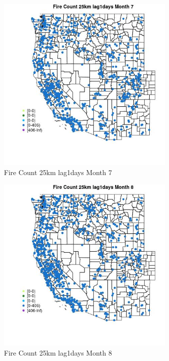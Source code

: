 \begin{figure} 
\centering  
\includegraphics[width=0.77\textwidth]{Code_Outputs/Report_ML_input_PM25_Step4_part_f_de_duplicated_aves_prioritize_24hr_obswNAs_MapObsMo7Fire_Count_25km_lag1days.jpg} 
\caption{\label{fig:Report_ML_input_PM25_Step4_part_f_de_duplicated_aves_prioritize_24hr_obswNAsMapObsMo7Fire_Count_25km_lag1days}Fire Count 25km lag1days Month 7} 
\end{figure} 
 

\begin{figure} 
\centering  
\includegraphics[width=0.77\textwidth]{Code_Outputs/Report_ML_input_PM25_Step4_part_f_de_duplicated_aves_prioritize_24hr_obswNAs_MapObsMo8Fire_Count_25km_lag1days.jpg} 
\caption{\label{fig:Report_ML_input_PM25_Step4_part_f_de_duplicated_aves_prioritize_24hr_obswNAsMapObsMo8Fire_Count_25km_lag1days}Fire Count 25km lag1days Month 8} 
\end{figure} 
 

